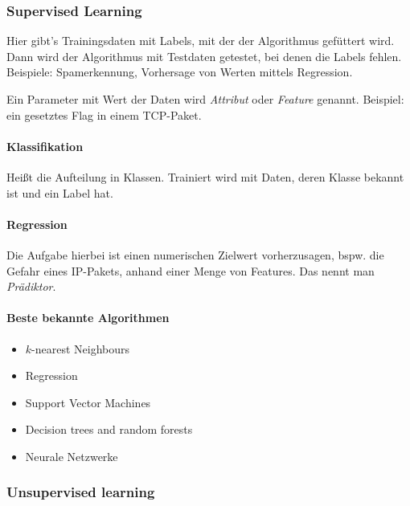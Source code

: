 \subsubsection{Supervised Learning}%
\label{ssub:supervised_learning}

Hier gibt’s Trainingsdaten mit Labels, mit der der Algorithmus gefüttert wird.
Dann wird der Algorithmus mit Testdaten getestet, bei denen die Labels fehlen.
Beispiele: Spamerkennung, Vorhersage von Werten mittels Regression.

Ein Parameter mit Wert der Daten wird \emph{Attribut} oder \emph{Feature} genannt.
Beispiel: ein gesetztes Flag in einem TCP-Paket.

\paragraph{Klassifikation}%
\label{par:klassifikation}

Heißt die Aufteilung in Klassen.
Trainiert wird mit Daten, deren Klasse bekannt ist und ein Label hat.

\paragraph{Regression}%
\label{par:regression}

Die Aufgabe hierbei ist einen numerischen Zielwert vorherzusagen, bspw. die Gefahr eines
IP-Pakets, anhand einer Menge von Features.
Das nennt man \emph{Prädiktor}.

\paragraph{Beste bekannte Algorithmen}%
\label{par:beste_bekannte_algorithmen}

\begin{itemize}
  \item $k$-nearest Neighbours
  \item Regression
  \item Support Vector Machines
  \item Decision trees and random forests
  \item Neurale Netzwerke
\end{itemize}

\subsubsection{Unsupervised learning}%
\label{ssub:unsupervised_learning}

